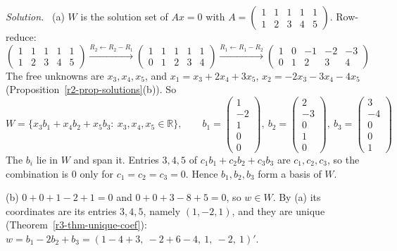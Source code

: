 \documentclass[12pt]{article}
\newcommand{\R}{\mathbb R}
\theoremstyle{definition}
\newenvironment{solution}{\par\noindent\textit{Solution.}\ }{\par\smallskip}
\begin{document}
\begin{solution}
(a) \(W\) is the solution set of \(Ax=0\) with
\(A=\left(\begin{smallmatrix}1&1&1&1&1\\1&2&3&4&5\end{smallmatrix}\right)\). Row-reduce:
\[
\begin{pmatrix}1&1&1&1&1\\1&2&3&4&5\end{pmatrix}
\xrightarrow{R_2\leftarrow R_2-R_1}
\begin{pmatrix}1&1&1&1&1\\0&1&2&3&4\end{pmatrix}
\xrightarrow{R_1\leftarrow R_1-R_2}
\begin{pmatrix}1&0&-1&-2&-3\\0&1&2&3&4\end{pmatrix}
\]
The free unknowns are \(x_3,x_4,x_5\), and \(x_1=x_3+2x_4+3x_5\), \(x_2=-2x_3-3x_4-4x_5\)
(Proposition~\ref{r2-prop-solutions}(b)). So
\[
W=\{x_3b_1+x_4b_2+x_5b_3:\ x_3,x_4,x_5\in\R\},\qquad
b_1=\begin{pmatrix}1\\-2\\1\\0\\0\end{pmatrix},\ b_2=\begin{pmatrix}2\\-3\\0\\1\\0\end{pmatrix},\
b_3=\begin{pmatrix}3\\-4\\0\\0\\1\end{pmatrix}
\]
The \(b_i\) lie in \(W\) and span it. Entries \(3,4,5\) of \(c_1b_1+c_2b_2+c_3b_3\) are
\(c_1,c_2,c_3\), so the combination is \(0\) only for \(c_1=c_2=c_3=0\). Hence \(b_1,b_2,b_3\)
form a basis of \(W\).

(b) \(0+0+1-2+1=0\) and \(0+0+3-8+5=0\), so \(w\in W\). By (a) its coordinates are its entries
\(3,4,5\), namely \((1,-2,1)\), and they are unique (Theorem~\ref{r3-thm-unique-coef}):
\(w=b_1-2b_2+b_3=(1-4+3,\ -2+6-4,\ 1,\ -2,\ 1)'\).
\end{solution}
\end{document}
